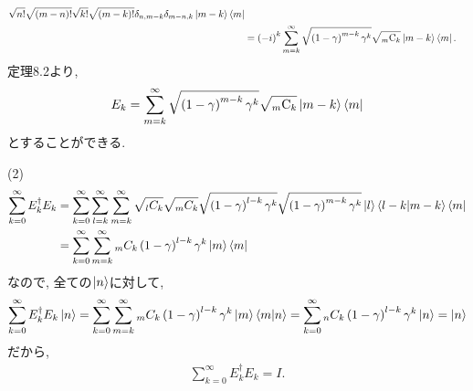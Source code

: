 \begin{ex}
\begin{align*}
        \sqrt{n!}\sqrt{\left(m-n\right)!}\sqrt{k!}\sqrt{\left(m-k\right)!}
        \delta_{n, m-k} \delta_{m-n,k}
        \ket{m-k}\bra{m}
        \\
         & =
         \left(-i\right)^{k} 
        \sum_{m=k}^\infty
        \sqrt{\left(1-\gamma\right)^{m-k} \gamma^k}
        \sqrt{{}_{m}\text{C}_{k}}
        \ket{m-k}\bra{m}.
    \end{align*}
    定理8.2より, 
    \begin{align*}
        E_k
        =
        \sum_{m=k}^\infty
        \sqrt{\left(1-\gamma\right)^{m-k} \gamma^k}
        \sqrt{{}_{m}\text{C}_{k}}
        \ket{m-k}\bra{m}
    \end{align*}
    とすることができる.
    \par
    (2) \
    \begin{align*}
        \sum_{k=0}^{\infty} E_k^\dagger E_k
         & =
        \sum_{k=0}^{\infty}
        \sum_{l=k}^{\infty}
        \sum_{m=k}^{\infty}
        \sqrt{{}_l C_k}\sqrt{{}_m C_k}
        \sqrt{\left(1- \gamma\right)^{l-k}\gamma^k}
        \sqrt{\left(1- \gamma\right)^{m-k}\gamma^k}
        \ket{l}\braket{l-k|m-k}\bra{m}
        \\
         & =
        \sum_{k=0}^{\infty}
        \sum_{m=k}^{\infty}
        {}_m C_k
        \left(1- \gamma\right)^{l-k}\gamma^k
        \ket{m}\bra{m}
    \end{align*}
    なので, 全ての$\ket{n}$に対して,
    \begin{align*}
        \sum_{k=0}^{\infty} E_k^\dagger E_k \ket{n} =
        \sum_{k=0}^{\infty}
        \sum_{m=k}^{\infty}
        {}_m C_k
        \left(1- \gamma\right)^{l-k}\gamma^k
        \ket{m}\braket{m|n}
        =
        \sum_{k=0}^{\infty}
        {}_n C_k
        \left(1- \gamma\right)^{l-k}\gamma^k
        \ket{n}
        =
        \ket{n}
    \end{align*}
    だから,
    \begin{align*}
        \sum_{k=0}^{\infty} E_k^\dagger E_k = I.
    \end{align*}
\end{ex}


